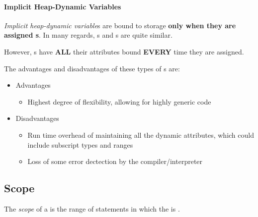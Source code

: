\paragraph{Implicit Heap-Dynamic Variables}\label{par:Implicit_Heap-Dynamic_Variable_Binding_Lifetime}
\begin{definition}\label{def:Implicit_Heap-Dynamic_Variable_Binding_Lifetime}
  \emph{Implicit heap-dynamic variable}s are bound to  storage \textbf{only when they are assigned s}.
  In many regards, s and s are quite similar.

  However, s have \textbf{ALL} their attributes bound \textbf{EVERY} time they are assigned.
\end{definition}

The advantages and disadvantages of these types of s are:
\begin{itemize}[noitemsep]
\item Advantages
  \begin{itemize}[noitemsep]
  \item Highest degree of flexibility, allowing for highly generic code
  \end{itemize}
\item Disadvantages
  \begin{itemize}[noitemsep]
  \item Run time overhead of maintaining all the dynamic attributes, which could include subscript types and ranges
  \item Loss of some error dectection by the compiler/interpreter
  \end{itemize}
\end{itemize}

\subsection{Scope}\label{subsec:Variable_Scope}
\begin{definition}[Scope]\label{def:Variable_Scope}
  The \emph{scope} of a  is the range of statements in which the  is .
\end{definition}

